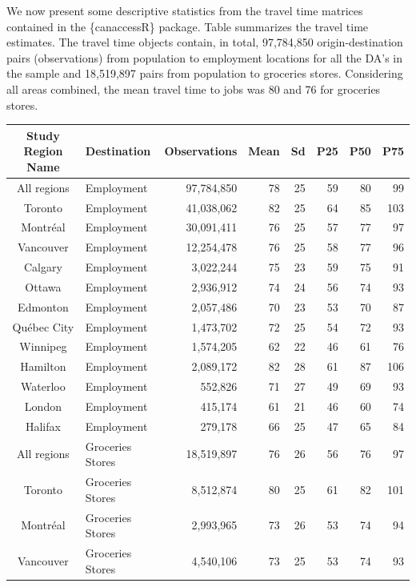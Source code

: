 \documentclass[Royal,times,sageh]{sagej}
\begin{document}
We now present some descriptive statistics from the travel time matrices
contained in the \{canaccessR\} package. Table \citet{tbl-table_1}
summarizes the travel time estimates. The travel time objects contain,
in total, 97,784,850 origin-destination pairs (observations) from
population to employment locations for all the DA's in the sample and
18,519,897 pairs from population to groceries stores. Considering all
areas combined, the mean travel time to jobs was 80 and 76 for groceries
stores.

\begin{table}[!t]
\fontsize{7.5pt}{9.0pt}\selectfont
\begin{tabular*}{1\linewidth}{@{\extracolsep{\fill}}clrrrrrr}
\toprule
Study Region Name & Destination & Observations & Mean & Sd & P25 & P50 & P75 \\ 
\midrule\addlinespace[2.5pt]
All regions & Employment & 97,784,850 & 78 & 25 & 59 & 80 & 99 \\ 
Toronto & Employment & 41,038,062 & 82 & 25 & 64 & 85 & 103 \\ 
Montréal & Employment & 30,091,411 & 76 & 25 & 57 & 77 & 97 \\ 
Vancouver & Employment & 12,254,478 & 76 & 25 & 58 & 77 & 96 \\ 
Calgary & Employment & 3,022,244 & 75 & 23 & 59 & 75 & 91 \\ 
Ottawa & Employment & 2,936,912 & 74 & 24 & 56 & 74 & 93 \\ 
Edmonton & Employment & 2,057,486 & 70 & 23 & 53 & 70 & 87 \\ 
Québec City & Employment & 1,473,702 & 72 & 25 & 54 & 72 & 93 \\ 
Winnipeg & Employment & 1,574,205 & 62 & 22 & 46 & 61 & 76 \\ 
Hamilton & Employment & 2,089,172 & 82 & 28 & 61 & 87 & 106 \\ 
Waterloo & Employment & 552,826 & 71 & 27 & 49 & 69 & 93 \\ 
London & Employment & 415,174 & 61 & 21 & 46 & 60 & 74 \\ 
Halifax & Employment & 279,178 & 66 & 25 & 47 & 65 & 84 \\ 
All regions & Groceries Stores & 18,519,897 & 76 & 26 & 56 & 76 & 97 \\ 
Toronto & Groceries Stores & 8,512,874 & 80 & 25 & 61 & 82 & 101 \\ 
Montréal & Groceries Stores & 2,993,965 & 73 & 26 & 53 & 74 & 94 \\ 
Vancouver & Groceries Stores & 4,540,106 & 73 & 25 & 53 & 74 & 93 \\ 

\end{tabular*}
\end{table}
\end{document}
